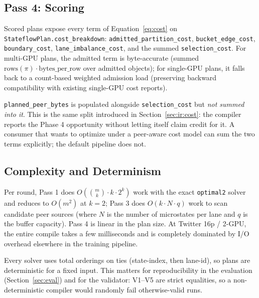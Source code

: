 \subsection{Pass 4: Scoring}\label{sec:compiler:score}

Scored plans expose every term of Equation~\ref{eq:cost} on
\texttt{StateflowPlan.cost\_breakdown}:
\texttt{admitted\_partition\_cost},
\texttt{bucket\_edge\_cost},
\texttt{boundary\_cost},
\texttt{lane\_imbalance\_cost}, and the summed
\texttt{selection\_cost}. For multi-GPU plans, the admitted term is
byte-accurate (summed $\mathrm{rows}(\pi) \cdot \mathrm{bytes\_per\_row}$
over admitted objects); for single-GPU plans, it falls back to a
count-based weighted admission load (preserving backward compatibility
with existing single-GPU cost reports).

\texttt{planned\_peer\_bytes} is populated alongside
\texttt{selection\_cost} but \emph{not summed into it}. This is the
same split introduced in Section~\ref{sec:ir:cost}: the compiler
reports the Phase 4 opportunity without letting itself claim credit
for it. A consumer that wants to optimize under a peer-aware cost
model can sum the two terms explicitly; the default pipeline does not.

\subsection{Complexity and Determinism}\label{sec:compiler:complexity}

Per round, Pass 1 does
$O\!\left(\binom{m}{k} \cdot k \cdot 2^k\right)$ work with the exact
\texttt{optimal2} solver and reduces to $O(m^2)$ at $k{=}2$;
Pass 3 does $O(k \cdot N \cdot q)$ work to scan candidate peer sources
(where $N$ is the number of microstates per lane and $q$ is the buffer
capacity). Pass 4 is linear in the plan size. At Twitter 16p / 2-GPU,
the entire compile takes a few milliseconds and is completely
dominated by I/O overhead elsewhere in the training pipeline.

Every solver uses total orderings on ties (state-index, then lane-id),
so plans are deterministic for a fixed input. This matters for
reproducibility in the evaluation (Section~\ref{sec:eval}) and for the
validator: V1--V5 are strict equalities, so a non-deterministic
compiler would randomly fail otherwise-valid runs.

